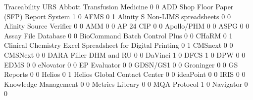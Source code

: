 \documentclass{article}
\begin{document}
\begin{Schunk}
\begin{Soutput}
                                                            Traceability URS
  Abbott Transfusion Medicine                                          0   0
  ADD Shop Floor Paper (SFP) Report System                             1   0
  AFMS                                                                 0   1
  Alinity S Non-LIMS spreadsheets                                      0   0
  Alinity Source Verifier                                              0   0
  AMM                                                                  0   0
  AP 24 CIP                                                            0   0
  Apollo/PHM                                                           0   0
  ASPG                                                                 0   0
  Assay File Database                                                  0   0
  BioCommand Batch Control Plus                                        0   0
  CHaRM                                                                0   1
  Clinical Chemistry Excel Spreadsheet for Digital Printing            0   1
  CMSnext                                                              0   0
  CMSNext                                                              0   0
  DARA Filler DHM and RU                                               0   0
  DaVinci                                                              1   0
  DFCS                                                                 1   0
  DPW                                                                  0   0
  EDMS                                                                 0   0
  eNovator                                                             0   0
  EP Evaluator                                                         0   0
  GDSN/GS1                                                             0   0
  Groninger                                                            0   0
  GS Reports                                                           0   0
  Helios                                                               0   1
  Helios Global Contact Center                                         0   0
  ideaPoint                                                            0   0
  IRIS                                                                 0   0
  Knowledge Management                                                 0   0
  Metrics Library                                                      0   0
  MQA Protocol                                                         1   0
  Navigator                                                            0   0

\end{Soutput}
\end{Schunk}
\end{document}
